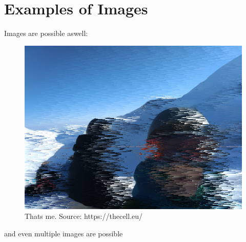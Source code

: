 \documentclass[10pt,a4paper]{article}
\begin{document}
\section{Examples of Images}
Images are possible aswell:
\begin{figure}[H]
	\includegraphics[width=\textwidth, height=\textheight, keepaspectratio]{example1.png}
	\caption{Thats me. Source: {https://thecell.eu/}}
\end{figure}

and even multiple images are possible
\end{document}
